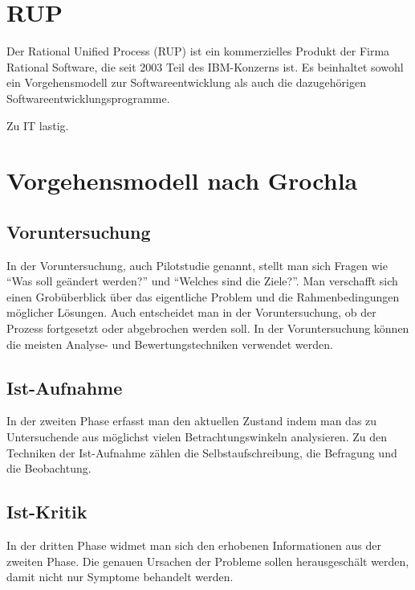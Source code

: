 \documentclass[]{scrreprt}
\begin{document}
    \clearpage
    
    \section{RUP}
    Der Rational Unified Process (RUP) ist ein kommerzielles Produkt der Firma Rational Software, die seit 2003 Teil des IBM-Konzerns ist. Es beinhaltet sowohl ein Vorgehensmodell zur Softwareentwicklung als auch die dazugehörigen Softwareentwicklungsprogramme.
    
    Zu IT lastig.
    
    \section{Vorgehensmodell nach Grochla}
    \subsection{Voruntersuchung}
    In der Voruntersuchung, auch Pilotstudie genannt, stellt man sich Fragen wie
    ``Was soll geändert werden?'' und ``Welches sind die Ziele?''. Man verschafft
    sich einen Grobüberblick über das eigentliche Problem und die Rahmenbedingungen
    möglicher Lösungen. Auch entscheidet man in der Voruntersuchung, ob der Prozess
    fortgesetzt oder abgebrochen werden soll. In der Voruntersuchung können die 
    meisten Analyse- und Bewertungstechniken verwendet werden.

    \subsection{Ist-Aufnahme}
    In der zweiten Phase erfasst man den aktuellen Zustand indem man das zu 
    Untersuchende aus möglichst vielen Betrachtungswinkeln analysieren. Zu den
    Techniken der Ist-Aufnahme zählen die Selbstaufschreibung, die Befragung und 
    die Beobachtung.

    \subsection{Ist-Kritik}
    In der dritten Phase widmet man sich den erhobenen Informationen aus der zweiten Phase. 
    Die genauen Ursachen der Probleme sollen herausgeschält werden, damit nicht nur 
    Symptome behandelt werden.
    
\end{document}
